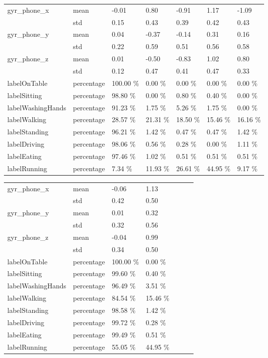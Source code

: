 \documentclass{article}
\begin{document}
\begin{tabular}{lllllll}
\multirow{2}{*}{ gyr\_phone\_x } & mean   &  -0.01  &  0.80  &  -0.91  &  1.17  &  -1.09 \\
 & std   &  0.15  &  0.43  &  0.39  &  0.42  &  0.43 \\
\multirow{2}{*}{ gyr\_phone\_y } & mean   &  0.04  &  -0.37  &  -0.14  &  0.31  &  0.16 \\
 & std   &  0.22  &  0.59  &  0.51  &  0.56  &  0.58 \\
\multirow{2}{*}{ gyr\_phone\_z } & mean   &  0.01  &  -0.50  &  -0.83  &  1.02  &  0.80 \\
 & std   &  0.12  &  0.47  &  0.41  &  0.47  &  0.33 \\
labelOnTable  & percentage   &  100.00 \%  &  0.00 \%  &  0.00 \%  &  0.00 \%  &  0.00 \% \\
labelSitting  & percentage   &  98.80 \%  &  0.00 \%  &  0.80 \%  &  0.40 \%  &  0.00 \% \\
labelWashingHands  & percentage   &  91.23 \%  &  1.75 \%  &  5.26 \%  &  1.75 \%  &  0.00 \% \\
labelWalking  & percentage   &  28.57 \%  &  21.31 \%  &  18.50 \%  &  15.46 \%  &  16.16 \% \\
labelStanding  & percentage   &  96.21 \%  &  1.42 \%  &  0.47 \%  &  0.47 \%  &  1.42 \% \\
labelDriving  & percentage   &  98.06 \%  &  0.56 \%  &  0.28 \%  &  0.00 \%  &  1.11 \% \\
labelEating  & percentage   &  97.46 \%  &  1.02 \%  &  0.51 \%  &  0.51 \%  &  0.51 \% \\
labelRunning  & percentage   &  7.34 \%  &  11.93 \%  &  26.61 \%  &  44.95 \%  &  9.17 \% \\
\end{tabular}
\begin{tabular}{lllllll}
\multirow{2}{*}{ gyr\_phone\_x } & mean   &  -0.06  &  1.13 \\
 & std   &  0.42  &  0.50 \\
\multirow{2}{*}{ gyr\_phone\_y } & mean   &  0.01  &  0.32 \\
 & std   &  0.32  &  0.56 \\
\multirow{2}{*}{ gyr\_phone\_z } & mean   &  -0.04  &  0.99 \\
 & std   &  0.34  &  0.50 \\
labelOnTable  & percentage   &  100.00 \%  &  0.00 \% \\
labelSitting  & percentage   &  99.60 \%  &  0.40 \% \\
labelWashingHands  & percentage   &  96.49 \%  &  3.51 \% \\
labelWalking  & percentage   &  84.54 \%  &  15.46 \% \\
labelStanding  & percentage   &  98.58 \%  &  1.42 \% \\
labelDriving  & percentage   &  99.72 \%  &  0.28 \% \\
labelEating  & percentage   &  99.49 \%  &  0.51 \% \\
labelRunning  & percentage   &  55.05 \%  &  44.95 \% \\

\end{tabular}
\end{document}
